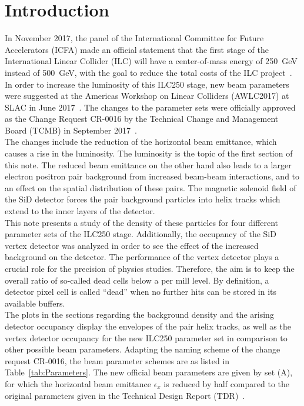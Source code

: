\documentclass[12pt]{article}
\begin{document}
\section{Introduction}
\label{sec:introduction}
In November 2017, the panel of the International Committee for Future Accelerators (ICFA) made an official statement that the first stage of the International Linear Collider (ILC) will have a center-of-mass energy of \SI{250}{\GeV} instead of \SI{500}{\GeV}, with the goal to reduce the total costs of the ILC project~\cite{ICFA_Statement}.
In order to increase the luminosity of this ILC250 stage, new beam parameters were suggested at the Americas Workshop on Linear Colliders (AWLC2017) at SLAC in June 2017~\cite{AWLC_Yokoya, AWLC_Jeans}.
The changes to the parameter sets were officially approved as the Change Request CR-0016 by the Technical Change and Management Board (TCMB) in September 2017~\cite{CR-0016}.\\
The changes include the reduction of the horizontal beam emittance, which causes a rise in the luminosity.
The luminosity is the topic of the first section of this note.
The reduced beam emittance on the other hand also leads to a larger electron positron pair background from increased beam-beam interactions, and to an effect on the spatial distribution of these pairs.
The magnetic solenoid field of the SiD detector forces the pair background particles into helix tracks which extend to the inner layers of the detector.\\
This note presents a study of the density of these particles for four different parameter sets of the ILC250 stage.
Additionally, the occupancy of the SiD vertex detector was analyzed in order to see the effect of the increased background on the detector.  
The performance of the vertex detector plays a crucial role for the precision of physics studies.
Therefore, the aim is to keep the overall ratio of so-called dead cells below a per mill level.
By definition, a detector pixel cell is called ``dead'' when no further hits can be stored in its available buffers.\\
The plots in the sections regarding the background density and the arising detector occupancy display the envelopes of the pair helix tracks, as well as the vertex detector occupancy for the new ILC250 parameter set in comparison to other possible beam parameters.
Adapting the naming scheme of the change request CR-0016, the beam parameter schemes are as listed in Table~\ref{tab:Parameters}.
The new official beam parameters are given by set (A), for which the horizontal beam emittance  $\epsilon_x$ is reduced by half compared to the original parameters given in the Technical Design Report (TDR)~\cite[p. 11]{TDR1}.
\end{document}
